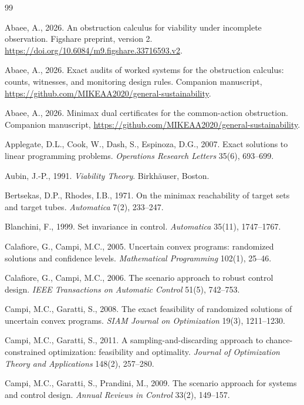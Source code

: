 \documentclass[11pt,a4paper]{article}
\theoremstyle{plain}
\theoremstyle{definition}
\theoremstyle{remark}
\begin{document}
\begin{thebibliography}{99}\footnotesize

 Abaee, A., 2026. An obstruction calculus for viability under incomplete observation. Figshare preprint, version 2. \url{https://doi.org/10.6084/m9.figshare.33716593.v2}.

 Abaee, A., 2026. Exact audits of worked systems for the obstruction calculus: counts, witnesses, and monitoring design rules. Companion manuscript, \url{https://github.com/MIKEAA2020/general-sustainability}.

 Abaee, A., 2026. Minimax dual certificates for the common-action obstruction. Companion manuscript, \url{https://github.com/MIKEAA2020/general-sustainability}.

 Applegate, D.L., Cook, W., Dash, S., Espinoza, D.G., 2007. Exact solutions to linear programming problems. \emph{Operations Research Letters} 35(6), 693--699.

 Aubin, J.-P., 1991. \emph{Viability Theory}. Birkh\"auser, Boston.

 Bertsekas, D.P., Rhodes, I.B., 1971. On the minimax reachability of target sets and target tubes. \emph{Automatica} 7(2), 233--247.

 Blanchini, F., 1999. Set invariance in control. \emph{Automatica} 35(11), 1747--1767.

 Calafiore, G., Campi, M.C., 2005. Uncertain convex programs: randomized solutions and confidence levels. \emph{Mathematical Programming} 102(1), 25--46.

 Calafiore, G., Campi, M.C., 2006. The scenario approach to robust control design. \emph{IEEE Transactions on Automatic Control} 51(5), 742--753.

 Campi, M.C., Garatti, S., 2008. The exact feasibility of randomized solutions of uncertain convex programs. \emph{SIAM Journal on Optimization} 19(3), 1211--1230.

 Campi, M.C., Garatti, S., 2011. A sampling-and-discarding approach to chance-constrained optimization: feasibility and optimality. \emph{Journal of Optimization Theory and Applications} 148(2), 257--280.

 Campi, M.C., Garatti, S., Prandini, M., 2009. The scenario approach for systems and control design. \emph{Annual Reviews in Control} 33(2), 149--157.


\end{thebibliography}
\end{document}
